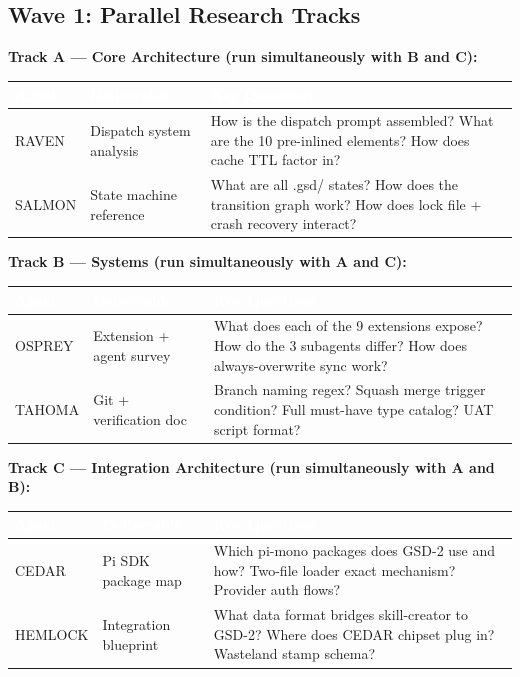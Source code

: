 \documentclass[11pt,letterpaper]{article}
\newcommand{\tableheader}[1]{\textbf{\sffamily\textcolor{white}{#1}}}
\begin{document}
\subsection{Wave 1: Parallel Research Tracks}

\textbf{Track A --- Core Architecture (run simultaneously with B and C):}

\begin{center}
\begin{tabularx}{\textwidth}{L{2.5cm}L{2.5cm}X}
\toprule
{}
\tableheader{Agent} & \tableheader{Deliverable} & \tableheader{Key Questions} \\
\midrule
RAVEN & Dispatch system analysis & How is the dispatch prompt assembled? What are the 10 pre-inlined elements? How does cache TTL factor in? \\
SALMON & State machine reference & What are all .gsd/ states? How does the transition graph work? How does lock file + crash recovery interact? \\
\bottomrule
\end{tabularx}
\end{center}

\textbf{Track B --- Systems (run simultaneously with A and C):}

\begin{center}
\begin{tabularx}{\textwidth}{L{2.5cm}L{2.5cm}X}
\toprule
{}
\tableheader{Agent} & \tableheader{Deliverable} & \tableheader{Key Questions} \\
\midrule
OSPREY & Extension + agent survey & What does each of the 9 extensions expose? How do the 3 subagents differ? How does always-overwrite sync work? \\
TAHOMA & Git + verification doc & Branch naming regex? Squash merge trigger condition? Full must-have type catalog? UAT script format? \\
\bottomrule
\end{tabularx}
\end{center}

\textbf{Track C --- Integration Architecture (run simultaneously with A and B):}

\begin{center}
\begin{tabularx}{\textwidth}{L{2.5cm}L{2.5cm}X}
\toprule
{}
\tableheader{Agent} & \tableheader{Deliverable} & \tableheader{Key Questions} \\
\midrule
CEDAR & Pi SDK package map & Which pi-mono packages does GSD-2 use and how? Two-file loader exact mechanism? Provider auth flows? \\
HEMLOCK & Integration blueprint & What data format bridges skill-creator to GSD-2? Where does CEDAR chipset plug in? Wasteland stamp schema? \\
\bottomrule
\end{tabularx}
\end{center}
\end{document}
